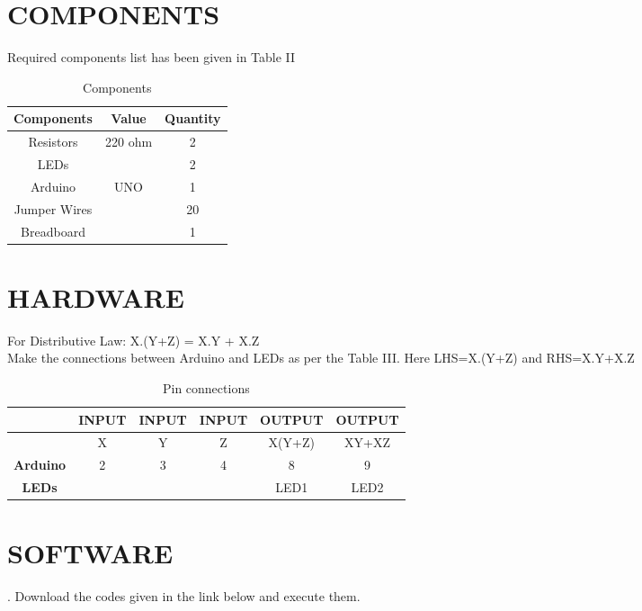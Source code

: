 \documentclass[conference]{IEEEtran}
\begin{document}
\section{COMPONENTS}
Required components list has been given in Table II
\begin{table}[h]
\centering
\begin{tabular}{| c | c | c |} \hline
\textbf{Components} & \textbf{Value} & \textbf{Quantity} \\\hline
Resistors & 220 ohm & 2 \\
LEDs &  & 2 \\
Arduino & UNO & 1 \\
Jumper Wires &  & 20 \\
Breadboard & & 1 \\ 
\hline
\end{tabular}
\vspace{0.4cm}
\caption{\label{tab:widgets}Components}
\end{table}

\section{HARDWARE}
\begin{flushleft}
For Distributive Law: X.(Y+Z) = X.Y + X.Z \\
Make the connections between Arduino and LEDs as per the Table III. Here LHS=X.(Y+Z) and RHS=X.Y+X.Z\\

\begin{table}[h]
\begin{tabular}{|c | c | c | c | c | c |} \hline
 & \textbf{INPUT} & \textbf{INPUT} & \textbf{INPUT} & \textbf{OUTPUT} & \textbf{OUTPUT} \\\hline
 & X & Y & Z & X(Y+Z) & XY+XZ \\ \hline
\textbf{Arduino}& 2 & 3 & 4 & 8 & 9 \\ \hline
\textbf{LEDs} &  &  &  & LED1 & LED2 \\ \hline
\end{tabular}
\vspace{0.4cm}
\caption{\label{tab:widgets}Pin connections}
\end{table}
\end{flushleft}
\vspace{4cm}

\section{SOFTWARE}
. Download the codes given in the link below and execute them.\\
\end{document}
